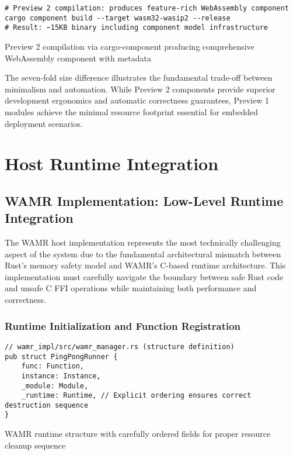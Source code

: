 \begin{listing}[H]
\begin{verbatim}
# Preview 2 compilation: produces feature-rich WebAssembly component
cargo component build --target wasm32-wasip2 --release
# Result: ~15KB binary including component model infrastructure
\end{verbatim}
\caption{Preview 2 compilation via cargo-component producing comprehensive WebAssembly component with metadata}
\label{lst:preview2-compilation}
\end{listing}

The seven-fold size difference illustrates the fundamental trade-off between minimalism and automation. While Preview 2 components provide superior development ergonomics and automatic correctness guarantees, Preview 1 modules achieve the minimal resource footprint essential for embedded deployment scenarios.

\section{Host Runtime Integration}
\label{sec:host-runtime-integration}

\subsection{WAMR Implementation: Low-Level Runtime Integration}

The WAMR host implementation represents the most technically challenging aspect of the system due to the fundamental architectural mismatch between Rust's memory safety model and WAMR's C-based runtime architecture. This implementation must carefully navigate the boundary between safe Rust code and unsafe C FFI operations while maintaining both performance and correctness.

\subsubsection{Runtime Initialization and Function Registration}

\begin{listing}[H]
\begin{verbatim}
// wamr_impl/src/wamr_manager.rs (structure definition)
pub struct PingPongRunner {
    func: Function,
    instance: Instance,
    _module: Module,
    _runtime: Runtime, // Explicit ordering ensures correct destruction sequence
}
\end{verbatim}
\caption{WAMR runtime structure with carefully ordered fields for proper resource cleanup sequence}
\label{lst:wamr-structure}
\end{listing}

